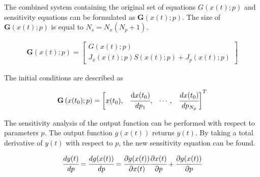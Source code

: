 \documentclass[../Article_Design_of_Experiment.tex]{subfiles}
\begin{document}
	The combined system containing the original set of equations ${G}({x}(t);{p})$ and sensitivity equations can be formulated as ${\textbf{G}}\left({x}(t);{p}\right)$. The size of ${\textbf{G}}\left({x}(t);{p}\right)$ is equal to $N_s = N_x(N_p + 1)$.
	
	{\footnotesize
		\begin{align}
			{\textbf{G}}\left({x}(t);{p}\right) = 
			\begin{bmatrix}
				{G}({x}(t);{p})\\
				{J_x}({x}(t);{p}){S}({x}(t);{p}) + {J_p}({x}(t);{p})
			\end{bmatrix}
	\end{align} }
	
	The initial conditions are described as
	
	{\footnotesize
		\begin{align}
			{\textbf{G}}\left({x}(t_0);{p}\right)  = 
			\begin{bmatrix} {x}(t_0),						& 
				\cfrac{ \text{d}{x}(t_0) }{ d{p_1} },		& 
				\cdots,					 					&
				\cfrac{ d{x}(t_0) }{ d{p_{N_p}} } 
			\end{bmatrix}^T
	\end{align} }
	
	The sensitivity analysis of the output function can be performed with respect to parameters ${p}$. The output function ${g}({x}(t))$ returns ${y}(t)$. By taking a total derivative of ${y}(t)$ with respect to ${p}$, the new sensitivity equation can be found.
	
	{\footnotesize
		\begin{align}
			\cfrac{d {y}(t)}{d{p}} = \cfrac{d {g}({x}(t))}{d{p}} = \cfrac{\partial {g}({x}(t))}{\partial {x}(t)} \cfrac{\partial {x}(t)}{\partial {p}} + \cfrac{\partial {g}({x}(t))}{\partial {p}}
	\end{align} }
	
\end{document}

